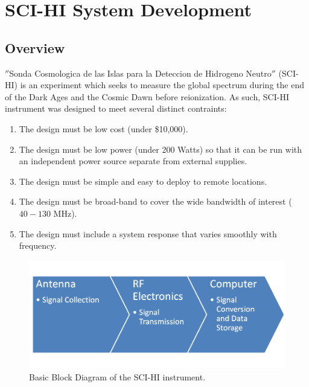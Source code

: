 \chapter{SCI-HI System Development}\label{Ch:System}

\section{Overview} \label{Sec:sysover}
$''$Sonda Cosmologica de las Islas para la Deteccion de Hidrogeno Neutro$''$ (SCI-HI) is an experiment which seeks to measure the \cm global spectrum during the end of the Dark Ages and the Cosmic Dawn before reionization. As such, SCI-HI instrument was designed to meet several distinct contraints:

\begin{enumerate}
\item The design must be low cost (under \$10,000).

\item The design must be low power (under  200 Watts) so that it can be run with an independent power source separate from external supplies. 

\item The design must be simple and easy to deploy to remote locations. 

\item The design must be broad-band to cover the wide bandwidth of interest ($40-130$ MHz).

\item The design must include a system response that varies smoothly with frequency. 

\end{enumerate}

\begin{figure}[bht]
\begin{center}
\includegraphics[width=0.9\linewidth]{SCIHI_system/figures/basic_block_diagram.png}
\caption{Basic Block Diagram of the SCI-HI instrument.}
\label{Fig:basic_block_diagram}
\end{center}
\end{figure}

